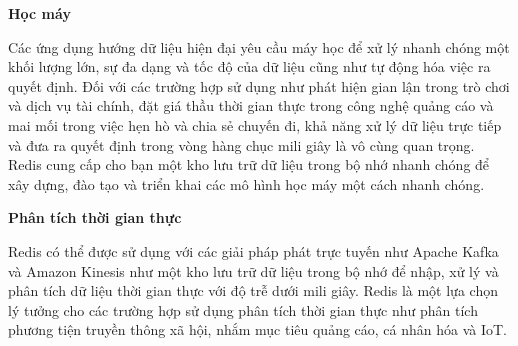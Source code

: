 \textbf{Học máy}

Các ứng dụng hướng dữ liệu hiện đại yêu cầu máy học để xử lý nhanh chóng một khối lượng lớn, sự đa dạng và tốc độ của dữ liệu cũng như tự động hóa việc ra quyết định. Đối với các trường hợp sử dụng như phát hiện gian lận trong trò chơi và dịch vụ tài chính, đặt giá thầu thời gian thực trong công nghệ quảng cáo và mai mối trong việc hẹn hò và chia sẻ chuyến đi, khả năng xử lý dữ liệu trực tiếp và đưa ra quyết định trong vòng hàng chục mili giây là vô cùng quan trọng. Redis cung cấp cho bạn một kho lưu trữ dữ liệu trong bộ nhớ nhanh chóng để xây dựng, đào tạo và triển khai các mô hình học máy một cách nhanh chóng.

\textbf{Phân tích thời gian thực}

Redis có thể được sử dụng với các giải pháp phát trực tuyến như Apache Kafka và Amazon Kinesis như một kho lưu trữ dữ liệu trong bộ nhớ để nhập, xử lý và phân tích dữ liệu thời gian thực với độ trễ dưới mili giây. Redis là một lựa chọn lý tưởng cho các trường hợp sử dụng phân tích thời gian thực như phân tích phương tiện truyền thông xã hội, nhắm mục tiêu quảng cáo, cá nhân hóa và IoT.

